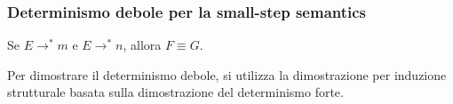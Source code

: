\subsubsection{Determinismo debole per la small-step semantics}
\begin{tcolorbox}[title = {Determinismo forte per la small-step semantics}]
  Se $E \rightarrow^* m$ e $E \rightarrow^* n$, allora $F \equiv G$.
\end{tcolorbox}
Per dimostrare il determinismo debole, si utilizza la dimostrazione per induzione
strutturale basata sulla dimostrazione del determinismo forte.